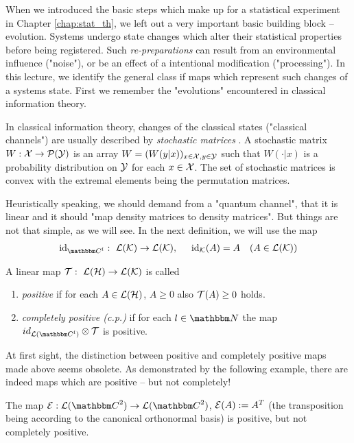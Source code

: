 When we introduced the basic steps which make up for a statistical experiment in 
Chapter \ref{chap:stat_th}, we left out a very important basic building block -- evolution. Systems undergo state changes which alter their statistical properties before being registered. Such \emph{re-preparations} can result from an environmental influence ("noise"), or be an effect of a intentional modification ("processing"). 
In this lecture, we identify the general class if maps which represent such changes of a systems state. First we remember the "evolutions" encountered in classical information theory.
\begin{example}
 In classical information theory, changes of the classical states ("classical channels") are usually described by \emph{stochastic matrices}  . A stochastic matrix $W: {\mathcal X} \rightarrow {\mathcal P}({\mathcal Y})$ is an array $W = (W(y|x))_{x \in {\mathcal X}, y \in {\mathcal Y}}$ such that $W(\cdot|x)$ is a probability distribution on ${\mathcal Y}$ for each $x \in {\mathcal X}$. The set of stochastic matrices is convex with the extremal elements being the permutation matrices.
\end{example}
Heuristically speaking, we should demand from a "quantum channel", that it is linear and it should "map density matrices to density matrices". But things are not that simple, as we will see. In the next definition, we will use the map 
\begin{align*}
 \id_{\bbmC^l}: \ \cL(\cK) \rightarrow \cL(\cK), \hspace{.5cm} \id_{\cK}(A) = A &&(A \in \cL(\cK))
\end{align*}
\begin{definition}[c.p. map]    
A linear map  ${\mathcal T}:\ {\mathcal L}({\mathcal H}) \rightarrow {\mathcal L}({\mathcal K})$ is called 
\begin{enumerate}
 \item \emph{positive} if for each $A \in {\mathcal L}({\mathcal H})$, $A \geq 0$ also ${\mathcal T}(A) \geq 0$ holds.
 \item \emph{completely positive (c.p.)} if for each $l \in \bbmN$ the map 
  $
  id_{\cL(\bbmC^{l})} \otimes \cT
  $
 is positive. 
\end{enumerate}
\end{definition}
At first sight, the distinction between positive and completely positive maps made above seems obsolete. As demonstrated by the following example, there are indeed maps which are positive -- but not completely! 
\begin{example}  \label{example:partial_transposition}
 The map $\cE: \cL(\bbmC^2) \rightarrow \cL(\bbmC^2)$,
 $ 
  {\mathcal E}(A) := A^T
 $
 (the transposition being according to the canonical orthonormal basis) is positive, but not completely positive. 
\end{example}
